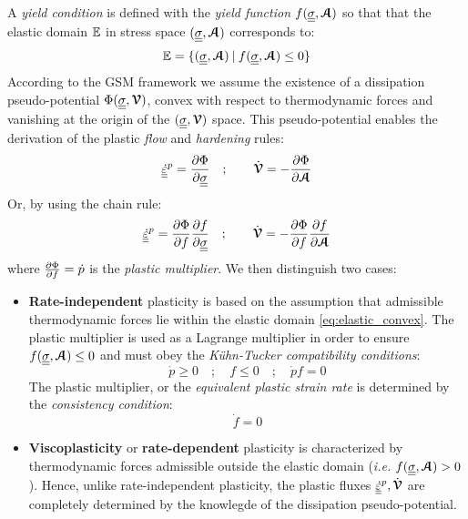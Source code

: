 A \textit{yield condition} is defined with the \textit{yield function} $f({\underline{\underline{\sigma}}},{\boldsymbol{\mathcal{A}}})$ so that that the elastic domain $\mathbb{E}$ in stress space $({\underline{\underline{\sigma}}},{\boldsymbol{\mathcal{A}}})$ corresponds to:
\begin{equation}
  \label{eq:elastic_convex}
  \mathbb{E} = \{ ({\underline{\underline{\sigma}}},{\boldsymbol{\mathcal{A}}})\: | \: f({\underline{\underline{\sigma}}},{\boldsymbol{\mathcal{A}}}) \leq 0\}
\end{equation}
According to the GSM framework \cite{GSM} we assume the existence of a dissipation pseudo-potential $\Phi({\underline{\underline{\sigma}}},{\boldsymbol{\mathcal{V}}})$, convex with respect to thermodynamic forces and vanishing at the origin of the $({\underline{\underline{\sigma}}},{\boldsymbol{\mathcal{V}}})$ space. This pseudo-potential enables the derivation of the plastic \textit{flow} and \textit{hardening} rules:
\begin{equation}
  \label{eq:flow_hardening_rule}
  {\underline{\underline{\dot{\varepsilon}}}}^p=\frac{\partial \Phi}{\partial {\underline{\underline{\sigma}}}} \quad ; \quad \quad \dot{{\boldsymbol{\mathcal{V}}}} = -\frac{\partial \Phi}{\partial {\boldsymbol{\mathcal{A}}}}
\end{equation}
Or, by using the chain rule:
\begin{equation}
  \label{eq:flow_hardening_rule_plast}
  {\underline{\underline{\dot{\varepsilon}}}}^p=\frac{\partial \Phi}{\partial f}\frac{\partial f}{\partial {\underline{\underline{\sigma}}}} \quad ; \quad \quad \dot{{\boldsymbol{\mathcal{V}}}} = -\frac{\partial \Phi}{\partial f}\frac{\partial f}{\partial {\boldsymbol{\mathcal{A}}}}
\end{equation}
where $\frac{\partial \Phi}{\partial f}=\dot{p}$ is the \textit{plastic multiplier}. We then distinguish two cases:
\begin{itemize}
\item \textbf{Rate-independent} plasticity is based on the assumption that admissible thermodynamic forces lie within the elastic domain \eqref{eq:elastic_convex}. The plastic multiplier is used as a Lagrange multiplier in order to ensure $f({\underline{\underline{\sigma}}},{\boldsymbol{\mathcal{A}}})\leq 0$ and must obey the \textit{K{\"u}hn-Tucker compatibility conditions}:
\begin{equation}
  \label{eq:Kuhn_Tucker}
  \dot{p} \geq 0 \quad ; \quad f \leq 0 \quad ; \quad \dot{p}f =0 
\end{equation}
The plastic multiplier, or the \textit{equivalent plastic strain rate} is determined by the \textit{consistency condition}:
\begin{equation}
  \label{eq:consistency_condition}
  \dot{f}=0
\end{equation}
\item \textbf{Viscoplasticity} or \textbf{rate-dependent} plasticity is characterized by thermodynamic forces admissible outside the elastic domain (\textit{i.e.} $f({\underline{\underline{\sigma}}},{\boldsymbol{\mathcal{A}}})>0$). Hence, unlike rate-independent plasticity, the plastic fluxes ${\underline{\underline{\dot{\varepsilon}}}}^p, \dot{{\boldsymbol{\mathcal{V}}}}$ are completely determined by the knowlegde of the dissipation pseudo-potential.
\end{itemize}


